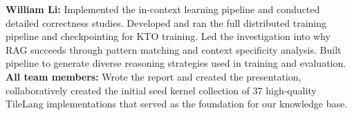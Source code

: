\documentclass{article}
\begin{document}
\textbf{William Li:} Implemented the in-context learning pipeline and conducted detailed correctness studies. Developed and ran the full distributed training pipeline and checkpointing for KTO training. Led the investigation into why RAG succeeds through pattern matching and context specificity analysis. Built pipeline to generate diverse reasoning strategies used in training and evaluation. \\


\textbf{All team members:} Wrote the report and created the presentation, collaboratively created the initial seed kernel collection of 37 high-quality TileLang implementations that served as the foundation for our knowledge base.

{\small

}
\end{document}
